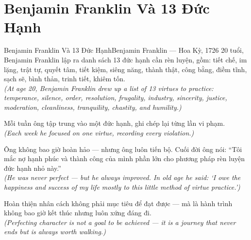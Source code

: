 \section{Benjamin Franklin Và 13 Đức Hạnh}
\begin{truyen}{Benjamin Franklin Và 13 Đức Hạnh}{Benjamin Franklin --- Hoa Kỳ, 1726}
 20 tuổi, Benjamin Franklin lập ra danh sách 13 đức hạnh cần rèn luyện, gồm: tiết chế, im lặng, trật tự, quyết tâm, tiết kiệm, siêng năng, thành thật, công bằng, điềm tĩnh, sạch sẽ, bình thản, trinh tiết, khiêm tốn.\\[4pt]
\textit{(At age 20, Benjamin Franklin drew up a list of 13 virtues to practice: temperance, silence, order, resolution, frugality, industry, sincerity, justice, moderation, cleanliness, tranquility, chastity, and humility.)}

Mỗi tuần ông tập trung vào một đức hạnh, ghi chép lại từng lần vi phạm.\\[4pt]
\textit{(Each week he focused on one virtue, recording every violation.)}

Ông không bao giờ hoàn hảo --- nhưng ông luôn tiến bộ. Cuối đời ông nói: ``Tôi mắc nợ hạnh phúc và thành công của mình phần lớn cho phương pháp rèn luyện đức hạnh nhỏ này.''\\[4pt]
\textit{(He was never perfect --- but he always improved. In old age he said: `I owe the happiness and success of my life mostly to this little method of virtue practice.')}

\end{truyen}
\begin{baihoc}
  Hoàn thiện nhân cách không phải mục tiêu để đạt được --- mà là hành trình không bao giờ kết thúc nhưng luôn xứng đáng đi.\\[4pt]
  \textit{(Perfecting character is not a goal to be achieved --- it is a journey that never ends but is always worth walking.)}
\end{baihoc}


